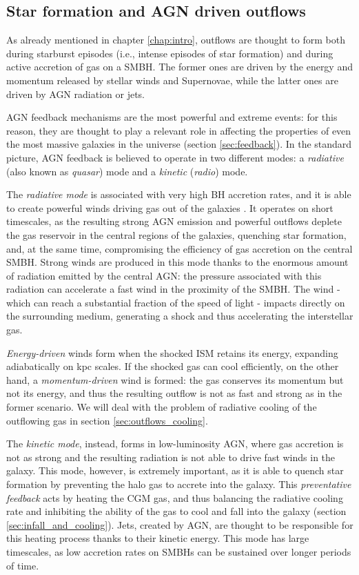 \subsection{Star formation and AGN driven outflows}

As already mentioned in chapter \ref{chap:intro}, outflows are thought to form both during starburst episodes (i.e., intense episodes of star formation) and during active accretion of gas on a SMBH. The former ones are driven by the energy and momentum released by stellar winds and Supernovae, while the latter ones are driven by AGN radiation or jets.

AGN feedback mechanisms are the most powerful and extreme events: for this reason, they are thought to play a relevant role in affecting the properties of even the most massive galaxies in the universe (section \ref{sec:feedback}). In the standard picture, AGN feedback is believed to operate in two different modes: a \textit{radiative} (also known as \textit{quasar}) mode and a \textit{kinetic} (\textit{radio}) mode. 

The \textit{radiative mode} is associated with very high BH accretion rates, and it is able to create powerful winds driving gas out of the galaxies \citep{silk_rees_agn}. It operates on short timescales, as the resulting strong AGN emission and powerful outflows deplete the gas reservoir in the central regions of the galaxies, quenching star formation, and, at the same time, compromising the efficiency of gas accretion on the central SMBH. Strong winds are produced in this mode thanks to the enormous amount of radiation emitted by the central AGN: the pressure associated with this radiation can accelerate a fast wind in the proximity of the SMBH. The wind - which can reach a substantial fraction of the speed of light \citep{kraemer2018physical} - impacts directly on the surrounding medium, generating a shock and thus accelerating the interstellar gas. 

\textit{Energy-driven} winds form when the shocked ISM retains its energy, expanding adiabatically on kpc scales. If the shocked gas can cool efficiently, on the other hand, a \textit{momentum-driven} wind is formed: the gas conserves its momentum but not its energy, and thus the resulting outflow is not as fast and strong as in the former scenario. We will deal with the problem of radiative cooling of the outflowing gas in section \ref{sec:outflows_cooling}. 

The \textit{kinetic mode}, instead, forms in low-luminosity AGN, where gas accretion is not as strong and the resulting radiation is not able to drive fast winds in the galaxy. This mode, however, is extremely important, as it is able to quench star formation by preventing the halo gas to accrete into the galaxy. This \textit{preventative feedback} acts by heating the CGM gas, and thus balancing the radiative cooling rate and inhibiting the ability of the gas to cool and fall into the galaxy (section \ref{sec:infall_and_cooling}). Jets, created by AGN, are thought to be responsible for this heating process thanks to their kinetic energy. This mode has large timescales, as low accretion rates on SMBHs can be sustained over longer periods of time. 


